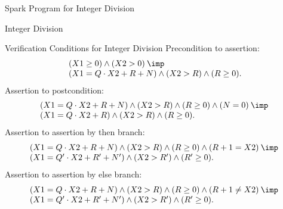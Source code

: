 \begin{wideslide}[bm=,toc=]{\large Spark Program for Integer Division}
\end{wideslide}

\begin{wideslide}[bm=,toc=]{\large Integer Division}
\end{wideslide}

\begin{wideslide}[bm=,toc=]{\large Verification Conditions for Integer Division}
\textsf{Precondition to assertion:}
\begin{displaymath}
\begin{array}{l}
(X1 \geq 0) \wedge (X2 > 0) \: \imp \: \\
(X1 = Q \cdot X2 + R + N) \wedge (X2 > R) \wedge (R \geq 0).
\end{array}
\end{displaymath}
\textsf{Assertion to postcondition:}
\begin{displaymath}
\begin{array}{l}
(X1 = Q \cdot X2 + R + N) \wedge (X2 > R) \wedge (R \geq 0)
\wedge (N = 0) \:\imp\:\\
(X1 = Q \cdot X2 + R) \wedge (X2 > R) \wedge (R \geq 0).
\end{array}
\end{displaymath}
\textsf{Assertion to assertion by \textsf{then} branch:}
\begin{displaymath}
\begin{array}{l}
(X1 = Q \cdot X2 + R + N) \wedge (X2 > R) \wedge (R \geq 0)
\wedge (R+1 = X2) \:\imp\:\\
(X1 = Q' \cdot X2 + R' + N') \wedge (X2 > R') \wedge (R' \geq 0).
\end{array}
\end{displaymath}
\textsf{Assertion to assertion by \textsf{else} branch:}
\begin{displaymath}
\begin{array}{l}
(X1 = Q \cdot X2 + R + N) \wedge (X2 > R) \wedge (R \geq 0)
\wedge (R+1 \neq X2) \:\imp\:\\
(X1 = Q' \cdot X2 + R' + N') \wedge (X2 > R') \wedge (R' \geq 0).
\end{array}
\end{displaymath}
\end{wideslide}
